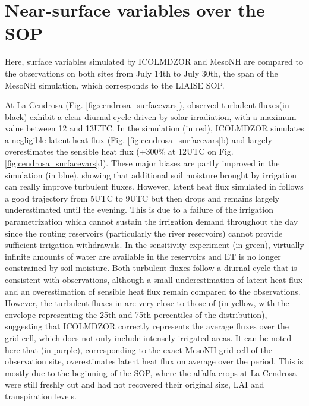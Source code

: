 \section{Near-surface variables over the SOP}
\label{sec:sop}

Here, surface variables simulated by ICOLMDZOR and MesoNH are compared to the observations on both sites from July 14th to July 30th, the span of the MesoNH simulation, which corresponds to the LIAISE SOP.

\hfill

At La Cendrosa (Fig. \ref{fig:cendrosa_surfacevars}), observed turbulent fluxes(in black) exhibit a clear diurnal cycle driven by solar irradiation, with a maximum value between 12 and 13UTC.
In the \noirr simulation (in red), ICOLMDZOR simulates a negligible latent heat flux (Fig. \ref{fig:cendrosa_surfacevars}b) and largely overestimates the sensible heat flux (+300\% at 12UTC on Fig. \ref{fig:cendrosa_surfacevars}d). 
These major biases are partly improved in the \irr simulation (in blue), showing that additional soil moisture brought by irrigation can really improve turbulent fluxes. However, latent heat flux simulated in \irr follows a good trajectory from 5UTC to 9UTC but then drops and remains largely underestimated until the evening. This is due to a failure of the irrigation parametrization which cannot sustain the irrigation demand throughout the day since the routing reservoirs (particularly the river reservoirs) cannot provide sufficient irrigation withdrawals. 
In the \irrboost sensitivity experiment (in green), virtually infinite amounts of water are available in the reservoirs and ET is no longer constrained by soil moisture. Both turbulent fluxes follow a diurnal cycle that is consistent with observations, although a small underestimation of latent heat flux and an overestimation of sensible heat flux remain compared to the observations. 
However, the turbulent fluxes in \irrboost are very close to those of \mesomean (in yellow, with the envelope representing the 25th and 75th percentiles of the distribution), suggesting that ICOLMDZOR correctly represents the average fluxes over the grid cell, which does not only include intensely irrigated areas.
It can be noted here that \mesoexact (in purple), corresponding to the exact MesoNH grid cell of the observation site, overestimates latent heat flux on average over the period. This is mostly due to the beginning of the SOP, where the alfalfa crops at La Cendrosa were still freshly cut and had not recovered their original size, LAI and transpiration levels.

